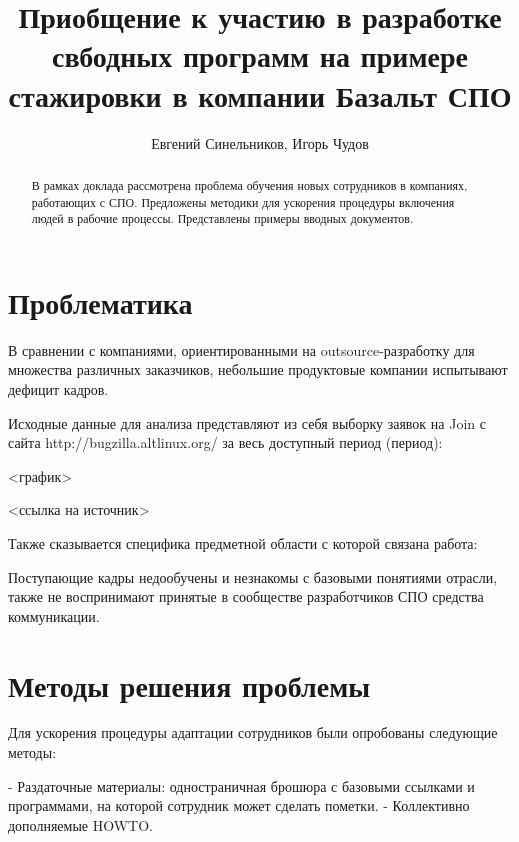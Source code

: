 \author{Евгений Синельников, Игорь Чудов}
\title{Приобщение к участию в разработке свбодных программ на примере
стажировки в компании Базальт СПО}
\maketitle

\begin{abstract}
  В рамках доклада рассмотрена проблема обучения новых
  сотрудников в компаниях, работающих с СПО. Предложены методики для
  ускорения процедуры включения людей в рабочие процессы. Представлены
  примеры вводных документов.
\end{abstract}


\section{Проблематика}

В сравнении с компаниями, ориентированными на outsource-разработку для
множества различных заказчиков, небольшие продуктовые компании
испытывают дефицит кадров.

Исходные данные для анализа представляют из себя выборку заявок на Join
с сайта http://bugzilla.altlinux.org/ за весь доступный период (период):

<график>

<ссылка на источник>

Также сказывается специфика предметной области с которой связана работа:

Поступающие кадры недообучены и незнакомы с базовыми понятиями отрасли,
также не воспринимают принятые в сообществе разработчиков СПО средства
коммуникации.


\section{Методы решения проблемы}

Для ускорения процедуры адаптации сотрудников были опробованы следующие
методы:

- Раздаточные материалы: одностраничная брошюра с базовыми ссылками и
  программами, на которой сотрудник может сделать пометки.
- Коллективно дополняемые HOWTO.


